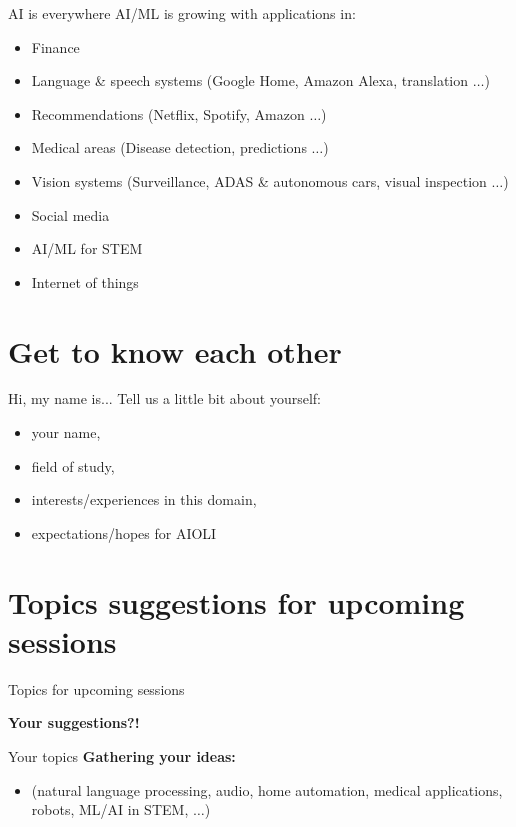 \documentclass[aspectratio=169]{beamer}
\begin{document}
	\begin{frame}{AI is everywhere}
		AI/ML is growing with applications in:		
		\begin{itemize}
			\item Finance
			\item Language \& speech systems (Google Home, Amazon Alexa, translation $\ldots$)
			\item Recommendations (Netflix, Spotify, Amazon $\ldots$)
			\item Medical areas (Disease detection, predictions $\ldots$)
			\item Vision systems (Surveillance, ADAS \& autonomous cars, visual inspection $\ldots$)
			\item Social media
			\item AI/ML for STEM
			\item Internet of things
		\end{itemize}
		
	\end{frame}

\section{Get to know each other}
	\begin{frame}{Hi, my name is...}
		Tell us a little bit about yourself: 
		\begin{itemize}
			\item your name, 
			\item field of study,
			\item interests/experiences in this domain,
			\item expectations/hopes for AIOLI
		\end{itemize}
	\end{frame}

\section{Topics suggestions for upcoming sessions}
	\begin{frame}{Topics for upcoming sessions}
		
	\centering \textbf{Your suggestions?!} 
	\end{frame}
	
	\begin{frame}{Your topics}
		\centering \textbf{Gathering your ideas:}
		\begin{itemize}
			\item (natural language processing, audio, home automation, medical applications, robots, ML/AI in STEM, $\ldots$)
		\end{itemize}
	\end{frame}
	
\end{document}
